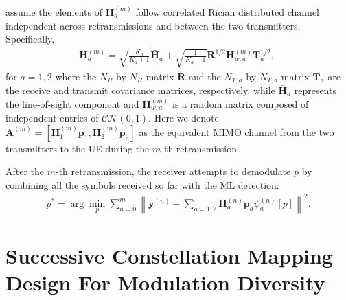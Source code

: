 \documentclass[journal]{IEEEtran}
\begin{document}
assume the elements of $\mathbf{H}_a^{(m)}$ follow correlated Rician
distributed channel~\cite{taricco2007optimum} independent across retransmissions
and between the two transmitters.
Specifically,
\begin{align}
    \mathbf{H}_a^{(m)} = \sqrt{\frac{K_a}{K_a+1}}\bar{\mathbf{H}}_{a} +
    \sqrt{\frac{1}{K_a+1}}
    \mathbf{R}^{1/2}\mathbf{H}_{w,a}^{(m)}\mathbf{T}_a^{1/2},\; 
\end{align}
for $a=1,2$ where the $N_R$-by-$N_R$ matrix $\mathbf{R}$ and the $N_{T,
a}$-by-$N_{T,a}$ matrix $\mathbf{T}_a$ are the receive and transmit covariance matrices,
respectively, while $\bar{\mathbf{H}}_{a}$ represents the line-of-sight
component and $\mathbf{H}_{w,a}^{(m)}$ is a random matrix composed of
independent entries of $\mathcal{CN}(0,1)$. Here we denote $\mathbf{A}^{(m)} =
[\mathbf{H}_1^{(m)}\mathbf{p}_1, \mathbf{H}_2^{(m)}\mathbf{p}_2]$ as the
equivalent MIMO channel from the two transmitters to the UE during the $m$-th
retransmission.

After the $m$-th retransmission, the receiver attempts to
demodulate $p$ by combining all the symbols received so far with the ML
detection:
\begin{align}
    p^* = \arg\min_p\sum_{n = 0}^{m}\left\|\mathbf{y}^{(n)} -
    \sum_{a=1,2}\mathbf{H}_a^{(n)}\mathbf{p}_a\psi_a^{(n)}[p]\right\|^2.
\end{align}

\section{Successive Constellation Mapping Design For Modulation Diversity}
\label{sec:modiv}
\end{document}
